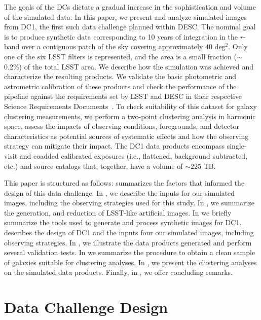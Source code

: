 \documentclass[a4paper,fleqn,usenatbib]{mnras}
\begin{document}
The goals of the DCs dictate a gradual increase in the
sophistication and volume of the simulated data. In this paper, we
present and analyze simulated images from DC1, the first such
data challenge planned within DESC. The nominal goal 
is to produce synthetic data corresponding to 10 years of integration
in the $r$-band over a contiguous patch of the sky covering approximately 40 deg$^{2}$. 
Only one of the six LSST filters is represented, and the area is 
a small fraction ($\sim$ 0.2\%) of the total LSST area. We
describe how the simulation was achieved and characterize the resulting
products. We validate the basic photometric and astrometric
calibration of these products and check the performance of the
pipeline against the requirements set by LSST and DESC in their
respective Science Requirements Documents~\citep{LPM-17,
  2018arXiv180901669T}. To check suitability of this dataset for galaxy clustering
measurements, we perform a two-point clustering analysis in harmonic space, 
assess the impacts of observing conditions, foregrounds, and detector characteristics as potential sources 
of systematic effects and how the observing strategy can mitigate their impact. The DC1 data products encompass single-visit and coadded calibrated exposures (i.e., flattened, background subtracted,
etc.) and source catalogs that, together, have a volume of $\sim 225$ TB.

This paper is structured as follows:  summarizes the factors that informed
the design of this data challenge.  In , we describe the inputs for our simulated images, including the observing strategies used for this study. In , we summarize the  generation, and reduction of LSST-like artificial images. In  we briefly summarize the tools used to generate and process synthetic images for DC1.  describes the design of DC1 and the inputs four our simulated images, including observing strategies. In , we illustrate the data products generated and perform several validation tests. In  we summarize the procedure to obtain a clean sample of galaxies suitable for clustering analyses. In , we present the clustering analyses on the simulated data products. Finally, in , we offer concluding remarks.


\section{Data Challenge Design}
\label{sec:design}
\end{document}
